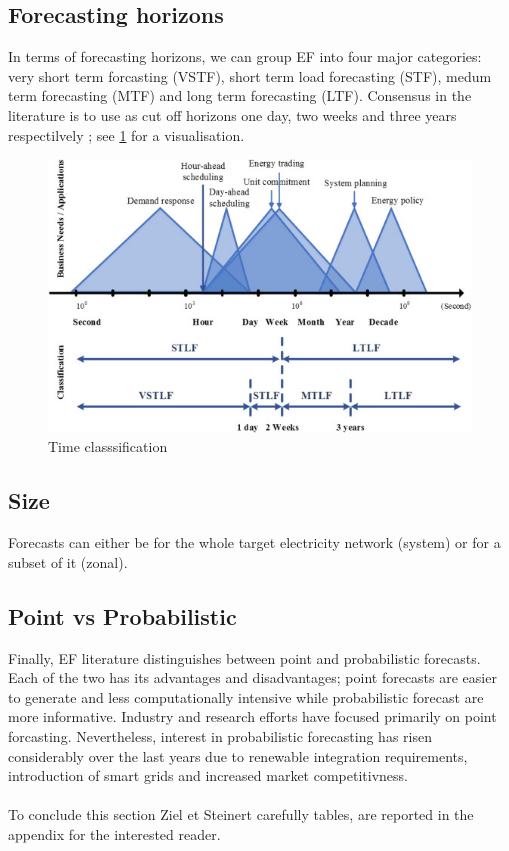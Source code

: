 \subsection{Forecasting horizons}\label{cls_time}
In terms of forecasting horizons, we can group EF into four major categories: very short term forcasting (VSTF), short term load forecasting (STF), medum term forecasting (MTF) and long term forecasting (LTF). Consensus in the literature is to use as cut off horizons one day, two weeks and three years respectilvely \cite{hong_phd}; see \ref{fig:time} for a visualisation. 
\begin{figure}
  \includegraphics[width=\textwidth]{images/time.jpg}
  \caption{Time classsification \cite{prob_elf}}
  \label{fig:time}
\end{figure}


\subsection{Size}
Forecasts can either be for the whole target electricity network (system) or for a subset of it (zonal).

\subsection{Point vs Probabilistic}\label{cls_pp}
Finally, EF literature distinguishes between point and probabilistic forecasts. Each of the two has its advantages and disadvantages; point forecasts are easier to generate and less computationally intensive while probabilistic forecast are more informative. Industry and research efforts have focused primarily on point forcasting. Nevertheless, interest in probabilistic forecasting has risen considerably over the last years due to renewable integration requirements, introduction of smart grids and increased market competitivness.
\\
\\
To conclude this section
Ziel et Steinert carefully tables, are reported in the appendix for the interested reader.

